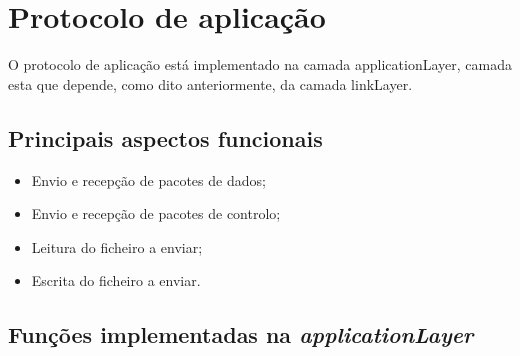 \documentclass[11pt]{article}
\begin{document}

\newpage
\section{Protocolo de aplicação}

O protocolo de aplicação está implementado na camada applicationLayer, camada esta que depende, como dito anteriormente, da camada linkLayer.

 \subsection{Principais aspectos funcionais}
 \begin{itemize}
  \item Envio e recepção de pacotes de dados;
  \item Envio e recepção de pacotes de controlo;
  \item Leitura do ficheiro a enviar;
  \item Escrita do ficheiro a enviar.
\end{itemize}
  
  \subsection{Funções implementadas na \textit{applicationLayer}}
\end{document}
